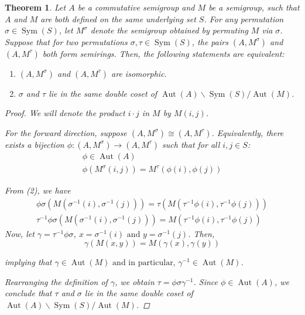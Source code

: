 \documentclass{article}
\theoremstyle{definition}
\theoremstyle{plain}
\newtheorem{theorem}[defn]{Theorem}
\begin{document}
\begin{theorem}
  \label{thm:isomorphism-condition}
  Let \(A\) be a commutative semigroup and \(M\) be a semigroup, such
  that \(A\) and \(M\) are both defined on the same underlying set
  \(S\). For any permutation \(\sigma \in \operatorname{Sym}(S)\),
  let \(M^\sigma\) denote the semigroup obtained by permuting \(M\)
  via \(\sigma\). Suppose that for two permutations \(\sigma,
  \tau\in\operatorname{Sym}(S)\), the pairs \((A,M^\sigma)\) and
  \((A,M^\tau)\) both form semirings. Then, the following statements
  are equivalent:
  \begin{enumerate}
    \item \((A, M^\sigma)\) and \((A, M^\tau)\) are isomorphic.
    \item \(\sigma\) and \(\tau\) lie in the same double coset of
      \(\operatorname{Aut}(A) \backslash \operatorname{Sym}(S) /
      \operatorname{Aut}(M)\).
  \end{enumerate}
  \begin{proof}
    We will denote the product \(i\cdot j\) in \(M\) by \(M(i,j)\).

    For the forward direction, suppose \((A, M^\sigma) \cong (A,
    M^\tau)\). Equivalently, there exists a bijection \(\phi: (A,
    M^\sigma) \to (A, M^\tau)\) such that for all \(i, j \in S\):
    \begin{gather}
      \phi \in \operatorname{Aut}(A)\\
      \phi(M^\sigma(i,j)) = M^\tau(\phi(i),\phi(j))
    \end{gather}

    From (2), we have
    \begin{gather*}
      \phi\sigma(M(\sigma^{-1}(i), \sigma^{-1}(j))) =
      \tau(M(\tau^{-1}\phi(i), \tau^{-1}\phi(j))) \\
      \tau^{-1}\phi\sigma(M(\sigma^{-1}(i), \sigma^{-1}(j))) =
      M(\tau^{-1}\phi(i), \tau^{-1}\phi(j))
    \end{gather*}
    Now, let \(\gamma = \tau^{-1}\phi\sigma\), \(x =
    \sigma^{-1}(i)\text{ and }y=\sigma^{-1}(j)\). Then,
    \[
      \gamma(M(x, y)) = M(\gamma(x), \gamma(y))
    \]

    implying that \(\gamma \in \operatorname{Aut}(M) \text{ and in
    particular, } \gamma^{-1} \in \operatorname{Aut}(M)\).

    Rearranging the definition of \(\gamma\), we obtain \(\tau =
    \phi\sigma\gamma^{-1}\). Since \(\phi \in
    \operatorname{Aut}(A)\), we conclude that \(\tau\) and \(\sigma\)
    lie in the same double coset of \(\operatorname{Aut}(A)
    \backslash \operatorname{Sym}(S) / \operatorname{Aut}(M)\).


\end{proof}
\end{theorem}
\end{document}
